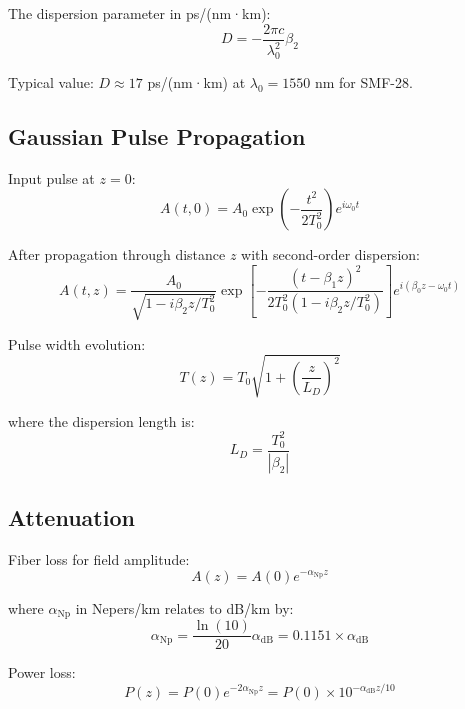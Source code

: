 \documentclass[12pt,a4paper]{article}
\begin{document}
The dispersion parameter in ps/(nm·km):
\begin{equation}
D = -\frac{2\pi c}{\lambda_0^2}\beta_2
\end{equation}

Typical value: $D \approx 17$ ps/(nm·km) at $\lambda_0 = 1550$ nm for SMF-28.

\subsection{Gaussian Pulse Propagation}

Input pulse at $z = 0$:
\begin{equation}
A(t,0) = A_0 \exp\left(-\frac{t^2}{2T_0^2}\right)e^{i\omega_0 t}
\end{equation}

After propagation through distance $z$ with second-order dispersion:
\begin{equation}
A(t,z) = \frac{A_0}{\sqrt{1 - i\beta_2 z/T_0^2}}\exp\left[-\frac{(t - \beta_1 z)^2}{2T_0^2(1 - i\beta_2 z/T_0^2)}\right]e^{i(\beta_0 z - \omega_0 t)}
\end{equation}

Pulse width evolution:
\begin{equation}
T(z) = T_0\sqrt{1 + \left(\frac{z}{L_D}\right)^2}
\end{equation}

where the dispersion length is:
\begin{equation}
L_D = \frac{T_0^2}{|\beta_2|}
\end{equation}

\subsection{Attenuation}

Fiber loss for field amplitude:
\begin{equation}
A(z) = A(0)e^{-\alpha_{\text{Np}}z}
\end{equation}

where $\alpha_{\text{Np}}$ in Nepers/km relates to dB/km by:
\begin{equation}
\alpha_{\text{Np}} = \frac{\ln(10)}{20}\alpha_{\text{dB}} = 0.1151 \times \alpha_{\text{dB}}
\end{equation}

Power loss:
\begin{equation}
P(z) = P(0)e^{-2\alpha_{\text{Np}}z} = P(0) \times 10^{-\alpha_{\text{dB}}z/10}
\end{equation}
\end{document}

